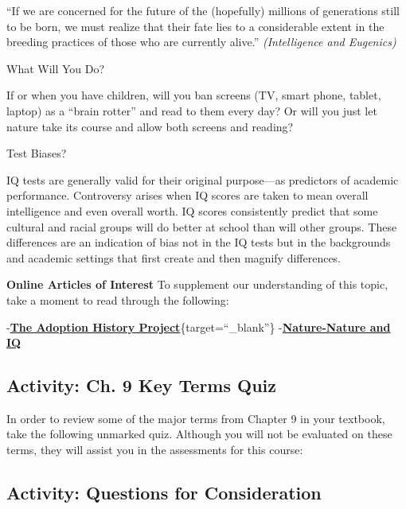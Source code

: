 \documentclass[
]{book}
\begin{document}
``If we are concerned for the future of the (hopefully) millions of generations still to be born, we must realize that their fate lies to a considerable extent in the breeding practices of those who are currently alive.'' \emph{(Intelligence and Eugenics)}

{What Will You Do?}

If or when you have children, will you ban screens (TV, smart phone, tablet, laptop) as a ``brain rotter'' and read to them every day? Or will you just let nature take its course and allow both screens and reading?

{Test Biases?}

IQ tests are generally valid for their original purpose---as predictors of academic performance. Controversy arises when IQ scores are taken to mean overall intelligence and even overall worth. IQ scores consistently predict that some cultural and racial groups will do better at school than will other groups. These differences are an indication of bias not in the IQ tests but in the backgrounds and academic settings that first create and then magnify differences.

\begin{caution}
\textbf{Online Articles of Interest}
To supplement our understanding of this topic, take a moment to read through the following:

-\href{https://darkwing.uoregon.edu/~adoption/topics/naturenurturestudies.htm}{\textbf{The Adoption History Project}}\{target=``\_blank''\}
-\href{http://unisci.com/stories/20012/0417014.htm}{\textbf{Nature-Nature and IQ}}
\end{caution}

\hypertarget{activity-ch.-9-key-terms-quiz}{%
\subsection*{Activity: Ch. 9 Key Terms Quiz}\label{activity-ch.-9-key-terms-quiz}}

\begin{reflect}
In order to review some of the major terms from Chapter 9 in your textbook, take the following unmarked quiz. Although you will not be evaluated on these terms, they will assist you in the assessments for this course:
\end{reflect}

\hypertarget{activity-questions-for-consideration-5}{%
\subsection*{Activity: Questions for Consideration}\label{activity-questions-for-consideration-5}}
\end{document}
